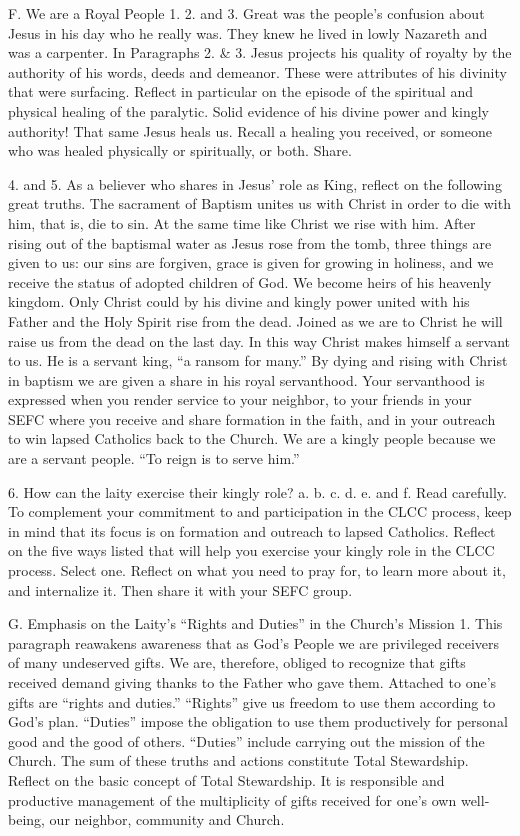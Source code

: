 \documentclass[oneside]{book}
\begin{document}
F. We are a Royal People
1. 2. and 3. Great was the people's confusion about Jesus in his day who he
really was. They knew he lived in lowly Nazareth and was a carpenter. In
Paragraphs 2. \& 3. Jesus projects his quality of royalty by the authority of
his words, deeds and demeanor. These were attributes of his divinity that were
surfacing. Reflect in particular on the episode of the spiritual and physical
healing of the paralytic. Solid evidence of his divine power and kingly
authority! That same Jesus heals us. Recall a healing you received, or someone
who was healed physically or spiritually, or both. Share.

4. and 5. As a believer who shares in Jesus' role as King, reflect on the
following great truths. The sacrament of Baptism unites us with Christ in order
to die with him, that is, die to sin. At the same time like Christ we rise with
him. After rising out of the baptismal water as Jesus rose from the tomb, three
things are given to us: our sins are forgiven, grace is given for growing in
holiness, and we receive the status of adopted children of God. We become heirs
of his heavenly kingdom. Only Christ could by his divine and kingly power united
with his Father and the Holy Spirit rise from the dead. Joined as we are to
Christ he will raise us from the dead on the last day. In this way Christ makes
himself a servant to us. He is a servant king, ``a ransom for many.'' By dying
and rising with Christ in baptism we are given a share in his royal
servanthood. Your servanthood is expressed when you render service to your
neighbor, to your friends in your SEFC where you receive and share formation in
the faith, and in your outreach to win lapsed Catholics back to the Church. We
are a kingly people because we are a servant people. ``To reign is to serve
him.''

6. How can the laity exercise their kingly role?
a. b. c. d. e. and f.  Read carefully. To complement your commitment to and
participation in the CLCC process, keep in mind that its focus is on formation
and outreach to lapsed Catholics. Reflect on the five ways listed that will help
you exercise your kingly role in the CLCC process. Select one. Reflect on what
you need to pray for, to learn more about it, and internalize it. Then share it
with your SEFC group.

G. Emphasis on the Laity's ``Rights and Duties'' in
  the Church's Mission
1. This paragraph reawakens awareness that as God's People we are privileged
receivers of many undeserved gifts. We are, therefore, obliged to recognize that
gifts received demand giving thanks to the Father who gave them. Attached to
one's gifts are ``rights and duties.'' ``Rights'' give us freedom to use them
according to God's plan. ``Duties'' impose the obligation to use them
productively for personal good and the good of others. ``Duties'' include
carrying out the mission of the Church. The sum of these truths and actions
constitute Total Stewardship. Reflect on the basic concept of Total
Stewardship. It is responsible and productive management of the multiplicity of
gifts received for one's own well-being, our neighbor, community and Church.
\end{document}
